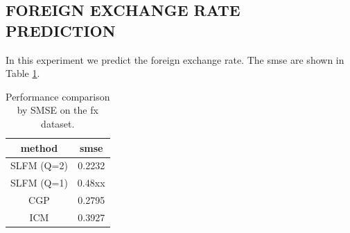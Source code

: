 \subsection{FOREIGN EXCHANGE RATE PREDICTION}
In this experiment we predict the foreign exchange rate.
The smse are shown in Table \ref{tab:fx}.

\begin{table}[h]
\caption{Performance comparison by SMSE on the fx dataset.}
\label{tab:fx}
\begin{center}
\begin{tabular}{c|c}
method & smse \\ \hline
SLFM (Q=2) & 0.2232 \\
SLFM (Q=1) & 0.48xx \\
CGP & 0.2795 \\
ICM & 0.3927
\end{tabular}
\end{center}
\end{table}

